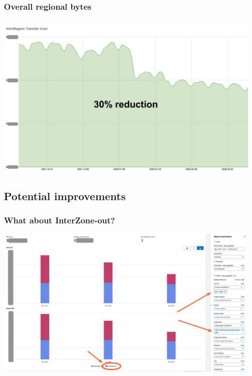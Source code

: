 \documentclass{beamer}
\begin{document}
\begin{frame}
  \frametitle{Overall regional bytes}

  \begin{center}
    \includegraphics[keepaspectratio,width=\textwidth,height=0.8\textheight]{overall.png}
  \end{center}
\end{frame}

\subsection{Potential improvements}

\begin{frame}
  \frametitle{What about InterZone-out?}

  \begin{center}
    \includegraphics[keepaspectratio,width=\textwidth,height=0.8\textheight]{ec2.png}
  \end{center}
\end{frame}
\end{document}
